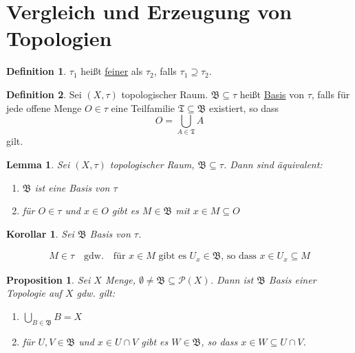 \documentclass[12pt]{scrartcl}%
\newtheorem{prop}{Proposition}
\newtheorem{korollar}{Korollar}
\newtheorem{lemma}{Lemma}
\theoremstyle{definition}
\newtheorem*{defn}{Definition}
\theoremstyle{remark}
\newcommand{\powerset}{\mathcal{P}}
\begin{document}
\section*{Vergleich und Erzeugung von Topologien}

\begin{defn}
    $\tau_1$ heißt \underline{feiner} als $\tau_2$, falls $\tau_1 \supseteq \tau_2$.
\end{defn}

\begin{defn}
    Sei $(X,\tau)$ topologischer Raum. $\mathfrak{B} \subseteq \tau$ heißt \underline{Basis} von $\tau$, falls für jede offene Menge $O\in \tau$ eine Teilfamilie $\mathfrak{T} \subseteq \mathfrak{B}$ existiert, so dass $$O = \bigcup_{A\in \mathfrak{T}} A$$ gilt.
\end{defn}

\begin{lemma}
    Sei $(X,\tau)$ topologischer Raum, $\mathfrak{B}\subseteq \tau$. Dann sind äquivalent:

    \begin{enumerate}[label=(\arabic*)]
        \item $\mathfrak{B}$ ist eine Basis von $\tau$
        \item für $O\in \tau$ und $x\in O$ gibt es $M\in \mathfrak{B}$ mit $x\in M \subseteq O$
    \end{enumerate}
\end{lemma}

\begin{korollar}
    Sei $\mathfrak{B}$ Basis von $\tau$.

    \begin{gather*}
        M\in \tau \quad \text{gdw.} \quad \text{für } x\in M \text{ gibt es } U_x \in \mathfrak{B} \text{, so dass } x\in U_x \subseteq M
    \end{gather*}
\end{korollar}

\begin{prop}
    Sei $X$ Menge, $\emptyset \neq \mathfrak{B} \subseteq \powerset(X)$. Dann ist $\mathfrak{B}$ Basis einer Topologie auf $X$ gdw. gilt:

    \begin{enumerate}[label=(\arabic*)]
        \item $\bigcup_{B\in \mathfrak{B}} B = X$
        \item für $U,V\in \mathfrak{B}$ und $x\in U\cap V$ gibt es $W\in\mathfrak{B}$, so dass $x\in W\subseteq U\cap V$.
    \end{enumerate}
\end{prop}
\end{document}
